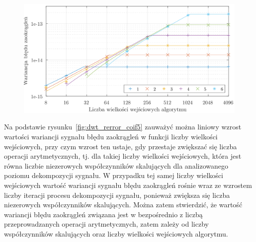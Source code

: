 \begin{figure}[htb!]
\begin{center}
\includegraphics{obrazki/dwt_rerror_coif5}
\end{center}
\end{figure}

Na podstawie rysunku~\ref{fig:dwt_rerror_coif5} zauważyć można liniowy wzrost wartości wariancji sygnału błędu zaokrągleń w funkcji liczby wielkości wejściowych, przy czym wzrost ten ustaje, gdy przestaje zwiększać się liczba operacji arytmetycznych, tj. dla takiej liczby wielkości wejściowych, która jest równa liczbie niezerowych współczynników skalujących dla analizowanego poziomu dekompozycji sygnału. W przypadku tej samej liczby wielkości wejściowych wartość wariancji sygnału błędu zaokrągleń rośnie wraz ze wzrostem liczby iteracji procesu dekompozycji sygnału, ponieważ zwiększa się liczba niezerowych współczynników skalujących. Można zatem stwierdzić, że wartość wariancji błędu zaokrągleń związana jest w bezpośrednio z liczbą przeprowadzanych operacji arytmetycznych, zatem zależy od liczby współczynników skalujących oraz liczby wielkości wejściowych algorytmu.

